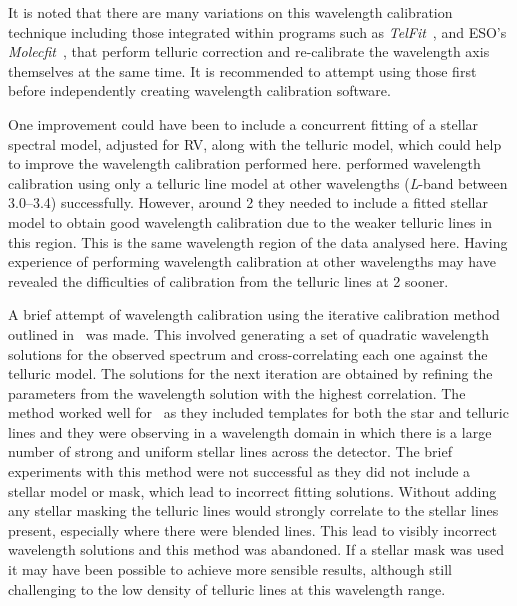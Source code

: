 It is noted that there are many variations on this wavelength calibration technique including those integrated within programs such as \emph{TelFit}~\citet{gullikson_correcting_2014}, and {ESO}'s \emph{Molecfit}~\citet{smette_molecfit_2015}, that perform telluric correction and re-calibrate the wavelength axis themselves at the same time.
It is recommended to attempt using those first before independently creating wavelength calibration software.

One improvement could have been to include a concurrent fitting of a stellar spectral model, adjusted for {RV}, along with the telluric model, which could help to improve the wavelength calibration performed here.
\citet{piskorz_evidence_2016} performed wavelength calibration using only a telluric line model at other \nir{} wavelengths (\emph{L}-band between 3.0--3.4\um{}) successfully.
However, around 2\um{} they needed to include a fitted stellar model to obtain good wavelength calibration due to the weaker telluric lines in this region.
This is the same wavelength region of the data analysed here.
Having experience of performing wavelength calibration at other wavelengths may have revealed the difficulties of calibration from the telluric lines at 2\um{} sooner.

A brief attempt of wavelength calibration using the iterative calibration method outlined in~\citet{brogi_rotation_2016} was made.
This involved generating a set of quadratic wavelength solutions for the observed spectrum and cross-correlating each one against the telluric model.
The solutions for the next iteration are obtained by refining the parameters from the wavelength solution with the highest correlation.
The method worked well for~\citet{brogi_rotation_2016} as they included templates for both the star and telluric lines and they were observing in a wavelength domain in which there is a large number of strong and uniform stellar  lines across the detector.
The brief experiments with this method were not successful as they did not include a stellar model or mask, which lead to incorrect fitting solutions.
Without adding any stellar masking the telluric lines would strongly correlate to the stellar lines present, especially where there were blended lines.
This lead to visibly incorrect wavelength solutions and this method was abandoned.
If a stellar mask was used it may have been possible to achieve more sensible results, although still challenging to the low density of telluric lines at this wavelength range.

